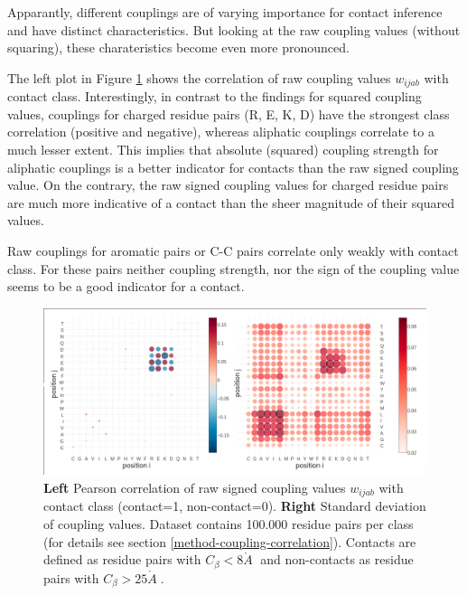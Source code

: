 \documentclass[12pt,a4paper,twoside]{book}
\newcommand{\Cb}{C_\beta}
\newcommand{\wijab}{w_{ijab}}
\newcommand{\angstrom}{\mathring{A} \;}
\theoremstyle{definition}
\theoremstyle{definition}
\theoremstyle{remark}
\begin{document}
Apparantly, different couplings are of varying importance for contact
inference and have distinct characteristics. But looking at the raw
coupling values (without squaring), these charateristics become even
more pronounced.

The left plot in Figure \ref{fig:coupling-correlation} shows the
correlation of raw coupling values \(\wijab\) with contact class.
Interestingly, in contrast to the findings for squared coupling values,
couplings for charged residue pairs (R, E, K, D) have the strongest
class correlation (positive and negative), whereas aliphatic couplings
correlate to a much lesser extent. This implies that absolute (squared)
coupling strength for aliphatic couplings is a better indicator for
contacts than the raw signed coupling value. On the contrary, the raw
signed coupling values for charged residue pairs are much more
indicative of a contact than the sheer magnitude of their squared
values.

Raw couplings for aromatic pairs or C-C pairs correlate only weakly with
contact class. For these pairs neither coupling strength, nor the sign
of the coupling value seems to be a good indicator for a contact.









\begin{figure}
\includegraphics[width=1\linewidth]{img/coupling_matrix_analysis/couplings_correlation_and_stddev_notitle} \caption{\textbf{Left} Pearson correlation of
raw signed coupling values \(\wijab\) with contact class (contact=1,
non-contact=0). \textbf{Right} Standard deviation of coupling values.
Dataset contains 100.000 residue pairs per class (for details see
section \ref{method-coupling-correlation}). Contacts are defined as
residue pairs with \(\Cb < 8 \angstrom\) and non-contacts as residue
pairs with \(\Cb > 25 \angstrom\).}\label{fig:coupling-correlation}
\end{figure}
\end{document}
